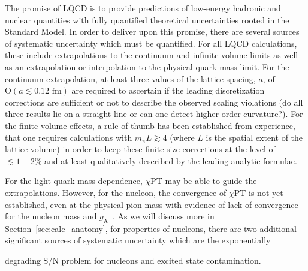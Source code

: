 \documentclass{ar-1col}
\begin{document}
The promise of LQCD is to provide predictions of low-energy hadronic and nuclear quantities with fully quantified theoretical uncertainties rooted in the Standard Model.
In order to deliver upon this promise, there are several sources of systematic uncertainty which must be quantified.
For all LQCD calculations, these include extrapolations to the continuum and infinite volume limits as well as an extrapolation or interpolation to the physical quark mass limit.
For the continuum extrapolation, at least three values of the lattice spacing, $a$, of $\mathrm{O}(a\lesssim0.12\textrm{ fm})$ are required to ascertain if the leading discretization corrections are sufficient or not to describe the observed scaling violations (do all three results lie on a straight line or can one detect higher-order curvature?).
For the finite volume effects, a rule of thumb has been established from experience, that one requires calculations with $m_\pi L \gtrsim4$ (where $L$ is the spatial extent of the lattice volume) in order to keep these finite size corrections at the level of $\lesssim1-2\%$ and at least qualitatively described by the leading analytic formulae.%
\begin{marginnote}
\end{marginnote}%
For the light-quark mass dependence, $\chi$PT may be able to guide the extrapolations.
However, for the nucleon, the convergence of $\chi$PT is not yet established, even at the physical pion mass with evidence of lack of convergence for the nucleon mass and $g_{\mathrm{A}}$~\cite{Chang:2018uxx,Walker-Loud:2019cif}.
As we will discuss more in Section~\ref{sec:calc_anatomy}, for properties of nucleons, there are two additional significant sources of systematic uncertainty which are the exponentially%
\begin{marginnote}
\end{marginnote}%
degrading S/N problem for nucleons and excited state contamination.



\end{document}
